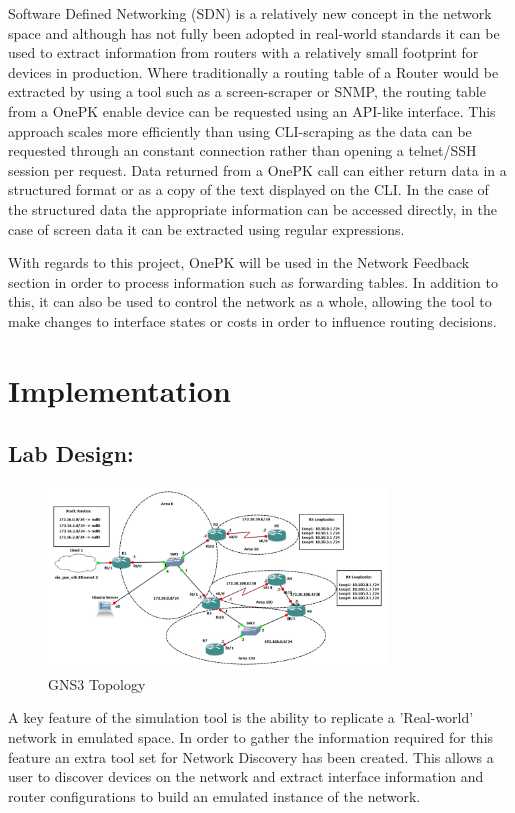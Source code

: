 \documentclass[11pt]{report}
\begin{document}
Software Defined Networking (SDN) is a relatively new concept in the network space and although has not fully been adopted in real-world standards it can be used to extract information from routers with a relatively small footprint for devices in production. Where traditionally a routing table of a Router would be extracted by using a tool such as a screen-scraper or SNMP, the routing table from a OnePK enable device can be requested using an API-like interface. This approach scales more efficiently than using CLI-scraping as the data can be requested through an constant connection rather than opening a telnet/SSH session per request. Data returned from a OnePK call can either return data in a structured format or as a copy of the text displayed on the CLI. In the case of the structured data the appropriate information can be accessed directly, in the case of screen data it can be extracted using regular expressions.

With regards to this project, OnePK will be used in the Network Feedback section in order to process information such as forwarding tables. In addition to this, it can also be used to control the network as a whole, allowing the tool to make changes to interface states or costs in order to influence routing decisions.

\chapter{Implementation}

\section{Lab Design:}

\begin{figure}[h!]
\caption{GNS3 Topology}
\centering
\includegraphics[width=0.8\textwidth]{OSPF-Topology.png}
\end{figure}

A key feature of the simulation tool is the ability to replicate a 'Real-world' network in emulated space. In order to gather the information required for this feature an extra tool set for Network Discovery has been created. This allows a user to discover devices on the network and extract interface information and router configurations to build an emulated instance of the network.
\end{document}
